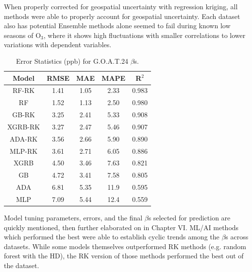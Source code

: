 When properly corrected for geospatial uncertainty with regression kriging, all methods were able to properly account for geospatial uncertainty. Each dataset also has potential  Ensemble methods alone seemed to fail during known low seasons of O$_3$, where it shows high fluctuations with smaller correlations to lower variations with dependent variables. \begin{table}[h!]
    \centering
        \begin{tabular}{||c|cccc||}
            \hline 
            \textbf{Model}	& \textbf{RMSE} & \textbf{MAE} & \textbf{MAPE} & \textbf{R$^{2}$} \\
            \hline \hline 
              RF-RK & 1.41 & 1.05 &  2.33 & 0.983 \\[3pt]
                 RF & 1.52 & 1.13 &  2.50 & 0.980 \\[3pt]
              GB-RK & 3.25 & 2.41 &  5.33 & 0.908 \\[3pt]
            XGRB-RK & 3.27 & 2.47 &  5.46 & 0.907 \\[3pt]
             ADA-RK & 3.56 & 2.66 &  5.90 & 0.890 \\[3pt]
             MLP-RK & 3.61 & 2.71 &  6.05 & 0.886 \\[3pt]
               XGRB & 4.50 & 3.46 &  7.63 & 0.821 \\[3pt]
                 GB & 4.72 & 3.41 &  7.58 & 0.805 \\[3pt]
                ADA & 6.81 & 5.35 & 11.9  & 0.595 \\[3pt]
                MLP & 7.09 & 5.44 & 12.4  & 0.559 \\
            \hline 
        \end{tabular}
    \caption{Error Statistics (ppb) for G.O.A.T.24 $\beta$s.} 
    \label{tab:G.O.A.T.24_modelerror}
\end{table} Model tuning parameters, errors, and the final $\beta$s selected for prediction are quickly mentioned, then further elaborated on in Chapter VI. ML/AI methods which performed the best were able to establish cyclic trends among the $\beta$s across datasets. While some models themselves outperformed RK methods (e.g. random forest with the HD), the RK version of those methods performed the best out of the dataset. %

